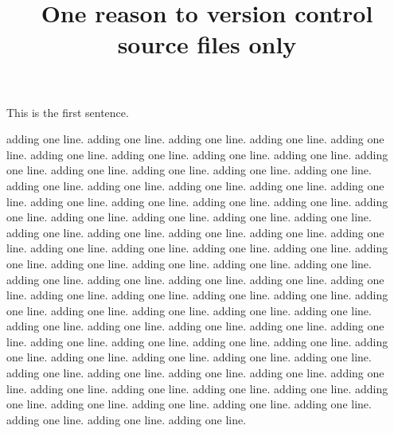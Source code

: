 \documentclass{article}
\title{One reason to version control source files only}
\begin{document}
\maketitle

This is the first sentence.

adding one line.
adding one line.
adding one line.
adding one line.
adding one line.
adding one line.
adding one line.
adding one line.
adding one line.
adding one line.
adding one line.
adding one line.
adding one line.
adding one line.
adding one line.
adding one line.
adding one line.
adding one line.
adding one line.
adding one line.
adding one line.
adding one line.
adding one line.
adding one line.
adding one line.
adding one line.
adding one line.
adding one line.
adding one line.
adding one line.
adding one line.
adding one line.
adding one line.
adding one line.
adding one line.
adding one line.
adding one line.
adding one line.
adding one line.
adding one line.
adding one line.
adding one line.
adding one line.
adding one line.
adding one line.
adding one line.
adding one line.
adding one line.
adding one line.
adding one line.
adding one line.
adding one line.
adding one line.
adding one line.
adding one line.
adding one line.
adding one line.
adding one line.
adding one line.
adding one line.
adding one line.
adding one line.
adding one line.
adding one line.
adding one line.
adding one line.
adding one line.
adding one line.
adding one line.
adding one line.
adding one line.
adding one line.
adding one line.
adding one line.
adding one line.
adding one line.
adding one line.
adding one line.
adding one line.
adding one line.
adding one line.
adding one line.
adding one line.
adding one line.
adding one line.
adding one line.
adding one line.
\end{document}
